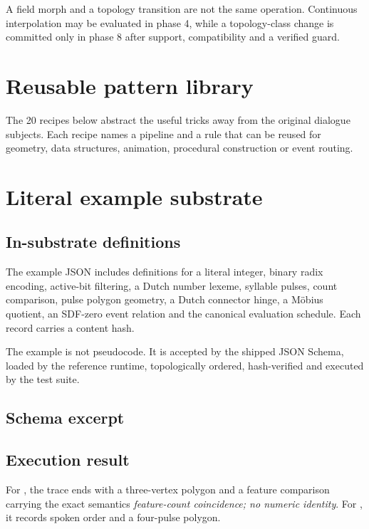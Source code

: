 \documentclass[10pt,a4paper]{article}
\newcommand{\code}[1]{\texttt{\detokenize{#1}}}
\begin{document}
\begin{boundarybox}
A field morph and a topology transition are not the same operation. Continuous interpolation may be evaluated in phase 4, while a topology-class change is committed only in phase 8 after support, compatibility and a verified guard.
\end{boundarybox}

\section{Reusable pattern library}
The 20 recipes below abstract the useful tricks away from the original dialogue subjects. Each recipe names a pipeline and a rule that can be reused for geometry, data structures, animation, procedural construction or event routing.

\begingroup
\small
\setlength{\tabcolsep}{2.5pt}

\endgroup

\section{Literal example substrate}

\subsection{In-substrate definitions}
The example JSON includes definitions for a literal integer, binary radix encoding, active-bit filtering, a Dutch number lexeme, syllable pulses, count comparison, pulse polygon geometry, a Dutch connector hinge, a Möbius quotient, an SDF-zero event relation and the canonical evaluation schedule. Each record carries a content hash.

\begin{definitionbox}
The example is not pseudocode. It is accepted by the shipped JSON Schema, loaded by the reference runtime, topologically ordered, hash-verified and executed by the test suite.
\end{definitionbox}

\subsection{Schema excerpt}

\subsection{Execution result}
For \code{number:19}, the trace ends with a three-vertex polygon and a feature comparison carrying the exact semantics \emph{feature-count coincidence; no numeric identity}. For \code{number:23}, it records spoken order \code{[3, "en", 20]} and a four-pulse polygon.
\end{document}
